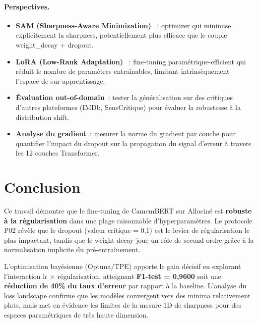 \documentclass[12pt,a4paper]{article}
\newcommand{\best}[1]{\textcolor{bestgreen}{\textbf{#1}}}
\begin{document}
\paragraph{Perspectives.}
\begin{itemize}
  \item \textbf{SAM (Sharpness-Aware Minimization)} \citep{foret2021sam}~:
    optimizer qui minimise explicitement la sharpness, potentiellement plus
    efficace que le couple weight\_decay + dropout.
  \item \textbf{LoRA (Low-Rank Adaptation)} \citep{hu2022lora}~: fine-tuning
    paramétrique-efficient qui réduit le nombre de paramètres entraînables,
    limitant intrinsèquement l'espace de sur-apprentissage.
  \item \textbf{Évaluation out-of-domain}~: tester la généralisation sur des
    critiques d'autres plateformes (IMDb, SensCritique) pour évaluer la
    robustesse à la distribution shift.
  \item \textbf{Analyse du gradient}~: mesurer la norme du gradient par couche
    pour quantifier l'impact du dropout sur la propagation du signal d'erreur
    à travers les 12 couches Transformer.
\end{itemize}

\section*{Conclusion}

Ce travail démontre que le fine-tuning de CamemBERT sur Allociné est \textbf{robuste
à la régularisation} dans une plage raisonnable d'hyperparamètres. Le protocole P02
révèle que le dropout (valeur critique = 0,1) est le levier de régularisation
le plus impactant, tandis que le weight decay joue un rôle de second ordre grâce
à la normalisation implicite du pré-entraînement.

L'optimisation bayésienne (Optuna/TPE) apporte le gain décisif en explorant
l'interaction lr × régularisation, atteignant \best{F1-test = 0,9600} soit
une \textbf{réduction de 40\% du taux d'erreur} par rapport à la baseline.
L'analyse du loss landscape confirme que les modèles convergent vers des minima
relativement plats, mais met en évidence les limites de la mesure 1D de sharpness
pour des espaces paramétriques de très haute dimension.
\end{document}
